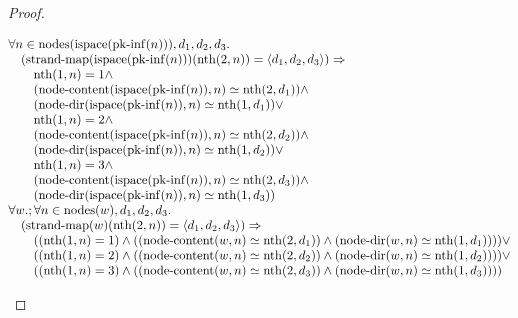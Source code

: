 \documentclass[11pt]{article}
\theoremstyle{plain}
\begin{document}
\begin{proof}
\begin{itemize}[leftmargin=2.8em, itemsep=4pt, parsep=1pt]
\begin{itemize}[leftmargin=2.8em, itemsep=4pt, parsep=1pt]
\begin{equation*}
\begin{array}{@{}l@{}}
\begin{array}{@{}l@{}} \forall n \in \operatorname{nodes}(\operatorname{ispace}(\operatorname{pk\text{-}inf}(n))), d_{1}, d_{2}, d_{3}. \\ \quad (\operatorname{strand\text{-}map}(\operatorname{ispace}(\operatorname{pk\text{-}inf}(n)))(\operatorname{nth}(2, n)) = \langle d_{1}, d_{2}, d_{3} \rangle) \Rightarrow  \\ \quad \quad \operatorname{nth}(1, n) = 1 \wedge \\ \quad \quad (\operatorname{node\text{-}content}(\operatorname{ispace}(\operatorname{pk\text{-}inf}(n)), n) \simeq \operatorname{nth}(2, d_{1})) \wedge \\ \quad \quad (\operatorname{node\text{-}dir}(\operatorname{ispace}(\operatorname{pk\text{-}inf}(n)), n) \simeq \operatorname{nth}(1, d_{1})) \vee \\ \quad \quad \operatorname{nth}(1, n) = 2 \wedge \\ \quad \quad (\operatorname{node\text{-}content}(\operatorname{ispace}(\operatorname{pk\text{-}inf}(n)), n) \simeq \operatorname{nth}(2, d_{2})) \wedge \\ \quad \quad (\operatorname{node\text{-}dir}(\operatorname{ispace}(\operatorname{pk\text{-}inf}(n)), n) \simeq \operatorname{nth}(1, d_{2})) \vee \\ \quad \quad \operatorname{nth}(1, n) = 3 \wedge \\ \quad \quad (\operatorname{node\text{-}content}(\operatorname{ispace}(\operatorname{pk\text{-}inf}(n)), n) \simeq \operatorname{nth}(2, d_{3})) \wedge \\ \quad \quad (\operatorname{node\text{-}dir}(\operatorname{ispace}(\operatorname{pk\text{-}inf}(n)), n) \simeq \operatorname{nth}(1, d_{3})) \end{array} \\
\begin{array}{@{}l@{}} \forall w.; \forall n \in \operatorname{nodes}(w), d_{1}, d_{2}, d_{3}. \\ \quad (\operatorname{strand\text{-}map}(w)(\operatorname{nth}(2, n)) = \langle d_{1}, d_{2}, d_{3} \rangle) \Rightarrow  \\ \quad \quad ((\operatorname{nth}(1, n) = 1) \wedge ((\operatorname{node\text{-}content}(w, n) \simeq \operatorname{nth}(2, d_{1})) \wedge (\operatorname{node\text{-}dir}(w, n) \simeq \operatorname{nth}(1, d_{1})))) \vee \\ \quad \quad ((\operatorname{nth}(1, n) = 2) \wedge ((\operatorname{node\text{-}content}(w, n) \simeq \operatorname{nth}(2, d_{2})) \wedge (\operatorname{node\text{-}dir}(w, n) \simeq \operatorname{nth}(1, d_{2})))) \vee \\ \quad \quad ((\operatorname{nth}(1, n) = 3) \wedge ((\operatorname{node\text{-}content}(w, n) \simeq \operatorname{nth}(2, d_{3})) \wedge (\operatorname{node\text{-}dir}(w, n) \simeq \operatorname{nth}(1, d_{3})))) \end{array} \\

\end{array}
\end{equation*}
\end{itemize}
\end{itemize}
\end{proof}
\end{document}
